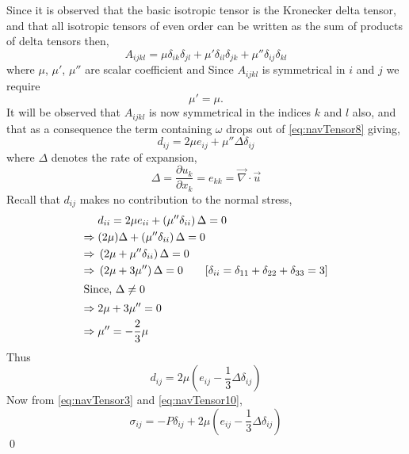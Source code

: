 \documentclass[../main-sheet.tex]{subfiles}
\begin{document}
\begin{soln}
    Since it is observed that the basic isotropic tensor is the Kronecker delta tensor, and that all isotropic tensors of even order can be written as the sum of products of delta tensors then,
    \begin{equation}
        A_{ijkl}=\mu\delta_{ik}\delta_{jl}+\mu'\delta_{il}\delta_{jk}+\mu''\delta_{ij}\delta_{kl}\label{eq:navTensor8}
    \end{equation}
    where \(\mu\), \(\mu'\), \(\mu''\) are scalar coefficient and Since \(A_{ijkl}\) is symmetrical in \(i\) and \(j\) we require
    \[\mu'=\mu.\]
    It will be observed that \(A_{ijkl}\) is now symmetrical in the indices \(k\) and \(l\) also, and that as a consequence the term containing \(\omega\) drops out of \eqref{eq:navTensor8} giving,
    \[d_{ij}=2\mu e_{ij}+\mu''\Delta\delta_{ij} \]
    where \(\Delta\) denotes the rate of expansion,
    \[\Delta=\frac{\partial u_k}{\partial x_k}=e_{kk}=\vec{\nabla}\cdot\vec{u}  \]
    Recall that \(d_{ij}\) makes no contribution to the normal stress,
    \begin{align*}
        & d_{ii}=2\mu e_{ii}+\left( \mu''\delta_{ii} \right)\Delta=0\\
        \Rightarrow\;& (2\mu)\Delta+\left( \mu''\delta_{ii} \right)\Delta=0\\
        \Rightarrow\;& \left( 2\mu+\mu''\delta_{ii} \right)\Delta=0\\
        \Rightarrow\;& \left( 2\mu+3\mu''\right)\Delta=0\qquad[\delta_{ii}=\delta_{11}+\delta_{22}+\delta_{33}=3 ]\\
        \intertext{Since, \(\Delta\neq 0\)}
        \Rightarrow\;& 2\mu+3\mu''=0\\
        \Rightarrow\;& \mu''=-\frac{2}{3}\mu
    \end{align*}
    Thus
    \begin{equation}
        d_{ij}=2\mu \left( e_{ij}-\frac{1}{3}\Delta\delta_{ij} \right)\label{eq:navTensor10}
    \end{equation}
    Now from \eqref{eq:navTensor3} and \eqref{eq:navTensor10},
    \[\sigma_{ij}=-P\delta_{ij}+2\mu(e_{ij}-\frac{1}{3}\Delta \delta_{ij})\]
    \qed
\newline


\end{soln}
\end{document}
